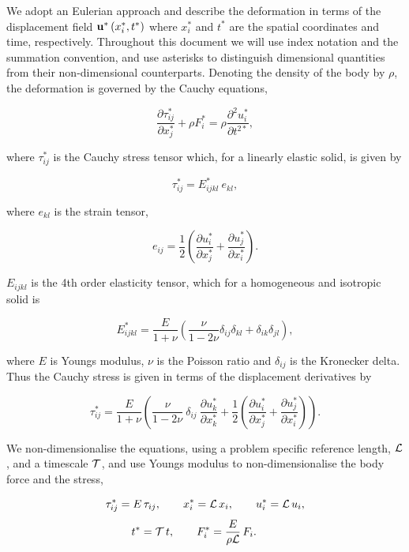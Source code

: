 We adopt an Eulerian approach and describe the deformation in terms of the displacement field $ {\bf u}^*\left( x_i^*,t^* \right) $ where $ x_i^* $ and $ t^* $ are the spatial coordinates and time, respectively. Throughout this document we will use index notation and the summation convention, and use asterisks to distinguish dimensional quantities from their non-\/dimensional counterparts. Denoting the density of the body by $ \rho $, the deformation is governed by the Cauchy equations, \begin{center} \[ \frac{\partial \tau_{ij}^*}{\partial x_j^*} + \rho F_i^* = \rho \frac{\partial^2 u_i^*}{\partial t^{2*}}, \] \end{center}  where $ \tau_{ij}^* $ is the Cauchy stress tensor which, for a linearly elastic solid, is given by \begin{center} \[ \tau_{ij}^* = E_{ijkl}^* \ e_{kl}, \] \end{center}  where $ e_{kl} $ is the strain tensor, \begin{center} \[ e_{ij} = \frac{1}{2} \left( \frac{\partial u_i^*}{\partial x_j^*}+ \frac{\partial u_j^*}{\partial x_i^*}\right). \] \end{center}  $ E_{ijkl} $ is the 4th order elasticity tensor, which for a homogeneous and isotropic solid is \begin{center} \[ E_{ijkl}^* = \frac{E}{1+\nu} \left(\frac{\nu}{1-2\nu} \delta_{ij} \delta_{kl} + \delta_{ik} \delta_{jl} \right), \] \end{center}  where $ E $ is Young\textquotesingle{}s modulus, $ \nu $ is the Poisson ratio and $ \delta_{ij} $ is the Kronecker delta. Thus the Cauchy stress is given in terms of the displacement derivatives by \begin{center} \[ \tau_{ij}^* = \frac{E}{1+\nu} \left(\frac{\nu}{1-2\nu} \ \delta_{ij} \ \frac{\partial u_k^*}{\partial x_k^*} + \frac{1}{2}\left(\frac{\partial u_i^*}{\partial x_j^*}+ \frac{\partial u_j^*}{\partial x_i^*} \right) \right). \] \end{center} 

We non-\/dimensionalise the equations, using a problem specific reference length, $ {\cal L} $, and a timescale $ {\cal T} $, and use Young\textquotesingle{}s modulus to non-\/dimensionalise the body force and the stress, \begin{center} \[ \tau_{ij}^* = E \, \tau_{ij}, \qquad x_i^* = {\cal L}\, x_i, \qquad u_i^* = {\cal L}\, u_i, \] \[ t^* = {\cal T}\, t, \qquad F_i^* = \frac{E}{\rho \cal L} \, F_i. \qquad \] \end{center} 

